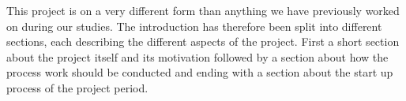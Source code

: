 This project is on a very different form than anything we have previously worked on during our studies.
The introduction has therefore been split into different sections, each describing the different aspects of the project.
First a short section about the project itself and its motivation followed by a section about how the process work should be conducted and ending with a section about the start up process of the project period.
